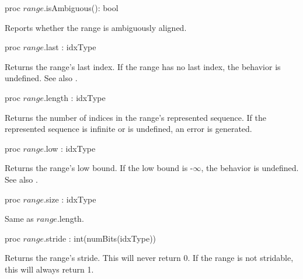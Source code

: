 \begin{protohead}
proc $range$.isAmbiguous(): bool
\end{protohead}
\begin{protobody}
Reports whether the range is ambiguously aligned.
\end{protobody}

\begin{protohead}
proc $range$.last : idxType
\end{protohead}
\begin{protobody}
Returns the range's last index.
If the range has no last index, the behavior is undefined.
See also .
\end{protobody}

\begin{protohead}
proc $range$.length : idxType
\end{protohead}
\begin{protobody}
Returns the number of indices in the range's represented sequence.
If the represented sequence is infinite or is undefined,
an error is generated.
\end{protobody}

\begin{protohead}
proc $range$.low : idxType
\end{protohead}
\begin{protobody}
Returns the range's low bound.
If the low bound is -$\infty$, the behavior is undefined.
See also .
\end{protobody}

\begin{protohead}
proc $range$.size : idxType
\end{protohead}
\begin{protobody}
Same as $range$.length.
\end{protobody}

\begin{protohead}
proc $range$.stride : int(numBits(idxType))
\end{protohead}
\begin{protobody}
Returns the range's stride. This will never return 0.
If the range is not stridable, this will always return 1.
\end{protobody}

